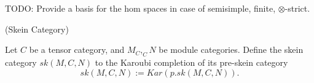 \noindent TODO: Provide a basis for the hom spaces in case of semisimple,
finite, $\otimes$-strict.

\begin{definition} (Skein Category)

  \noindent Let $C$ be a tensor category, and $M_{C}, _{C}N$ be module categories.
  Define the skein category $sk(M,C,N)$ to the Karoubi completion of its pre-skein category
  \[
    sk(M,C,N) := Kar(p.sk(M,C,N)).
  \]

\end{definition}
